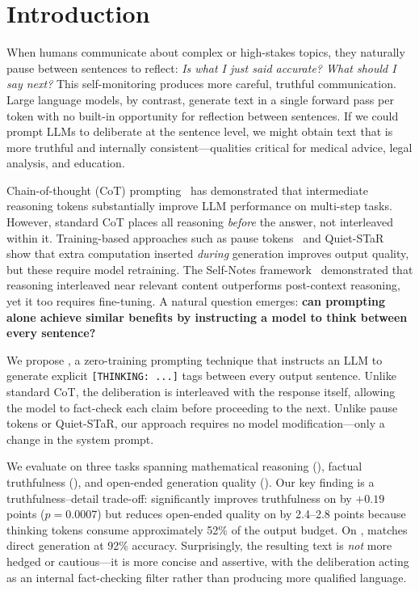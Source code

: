 \section{Introduction}
\label{sec:intro}

When humans communicate about complex or high-stakes topics, they naturally pause between sentences to reflect: \emph{Is what I just said accurate? What should I say next?} This self-monitoring produces more careful, truthful communication. Large language models, by contrast, generate text in a single forward pass per token with no built-in opportunity for reflection between sentences. If we could prompt LLMs to deliberate at the sentence level, we might obtain text that is more truthful and internally consistent---qualities critical for medical advice, legal analysis, and education.

Chain-of-thought (CoT) prompting~\cite{wei2022chain} has demonstrated that intermediate reasoning tokens substantially improve LLM performance on multi-step tasks. However, standard CoT places all reasoning \emph{before} the answer, not interleaved within it. Training-based approaches such as pause tokens~\cite{goyal2023think} and Quiet-STaR~\cite{zelikman2024quietstar} show that extra computation inserted \emph{during} generation improves output quality, but these require model retraining. The Self-Notes framework~\cite{lanchantin2023selfnotes} demonstrated that reasoning interleaved near relevant content outperforms post-context reasoning, yet it too requires fine-tuning. A natural question emerges: \textbf{can prompting alone achieve similar benefits by instructing a model to think between every sentence?}

We propose \sentthink, a zero-training prompting technique that instructs an LLM to generate explicit \texttt{[THINKING: ...]} tags between every output sentence. Unlike standard CoT, the deliberation is interleaved with the response itself, allowing the model to fact-check each claim before proceeding to the next. Unlike pause tokens or Quiet-STaR, our approach requires no model modification---only a change in the system prompt.

We evaluate \sentthink on three tasks spanning mathematical reasoning (\gsm), factual truthfulness (\tqa), and open-ended generation quality (\mtbench). Our key finding is a truthfulness--detail trade-off: \sentthink significantly improves truthfulness on \tqa by $+0.19$ points ($p{=}0.0007$) but reduces open-ended quality on \mtbench by 2.4--2.8 points because thinking tokens consume approximately 52\% of the output budget. On \gsm, \sentthink matches direct generation at 92\% accuracy. Surprisingly, the resulting text is \emph{not} more hedged or cautious---it is more concise and assertive, with the deliberation acting as an internal fact-checking filter rather than producing more qualified language.

